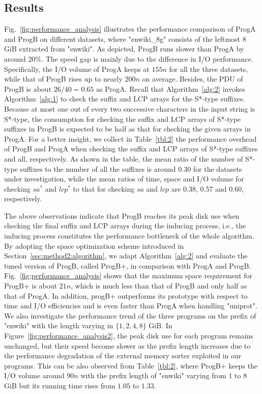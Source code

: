\documentclass[10pt,journal,compsoc]{IEEEtran}
\begin{document}
\subsection{Results} \label{sec:experiments:results}

Fig.~\ref{fig:performance_analysis} illustrates the performance comparison of ProgA and ProgB on different datasets, where "enwiki\_8g" consists of the leftmost 8 GiB extracted from "enwiki". As depicted, ProgB runs slower than ProgA by around 20\%. The speed gap is mainly due to the difference in I/O performance. Specifically, the I/O volume of ProgA keeps at $155n$ for all the three datasets, while that of ProgB rises up to nearly $200n$ on average. Besides, the PDU of ProgB is about $26/40=0.65$ as ProgA. Recall that Algorithm~\ref{alg:2} invokes Algorithm~\ref{alg:1} to check the suffix and LCP arrays for the S*-type suffixes. Because at most one out of every two successive characters in the input string is S*-type, the consumption for checking the suffix and LCP arrays of S*-type suffixes in ProgB is expected to be half as that for checking the given arrays in ProgA. For a better insight, we collect in Table~\ref{tbl:2} the performance overhead of ProgB and ProgA when checking the suffix and LCP arrays of S*-type suffixes and all, respectively. As shown in the table, the mean ratio of the number of S*-type suffixes to the number of all the suffixes is around 0.30 for the datasets under investigation, while the mean ratios of time, space and I/O volume for checking $sa^*$ and $lcp^*$ to that for checking $sa$ and $lcp$ are 0.38, 0.57 and 0.60, respectively. 

The above observations indicate that ProgB reaches its peak disk use when checking the final suffix and LCP arrays during the inducing process, i.e., the inducing process constitutes the performance bottleneck of the whole algorithm. By adopting the space optimization scheme introduced in Section~\ref{sec:method2:algorithm}, we adapt Algorithm~\ref{alg:2} and evaluate the tuned version of ProgB, called ProgB+, in comparison with ProgA and ProgB. Fig.~\ref{fig:performance_analysis} shows that the maximum space requirement for ProgB+ is about $21n$, which is much less than that of ProgB and only half as that of ProgA. In addition, progB+ outperforms its prototype with respect to time and I/O efficiencies and is even faster than ProgA when handling "uniprot". We also investigate the performance trend of the three programs on the prefix of "enwiki" with the length varying in $\{1, 2, 4, 8\}$ GiB. In Figure~\ref{fig:performance_analysis2}, the peak disk use for each program remains unchanged, but their speed become slower as the prefix length increases due to the performance degradation of the external memory sorter exploited in our programs. This can be also observed from Table~\ref{tbl:2}, where ProgB+ keeps the I/O volume around $90n$ with the prefix length of "enwiki" varying from $1$ to $8$ GiB but its running time rises from $1.05$ to $1.33$.
\end{document}
